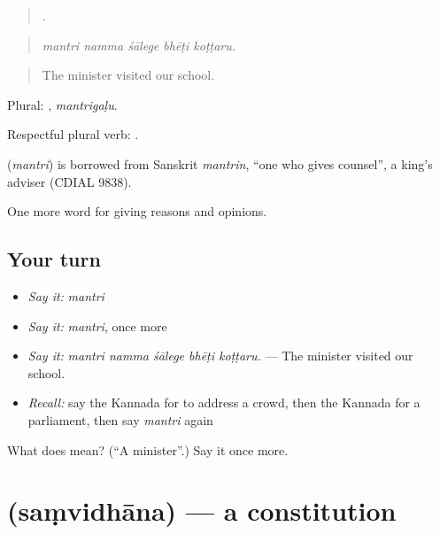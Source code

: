\begin{quote}
    .
\end{quote}

\begin{quote}
\emph{mantri namma śālege bhēṭi koṭṭaru.}
\end{quote}

\begin{quote}
The minister visited our school.
\end{quote}

Plural: , \emph{mantrigaḷu}.

Respectful plural verb:  .

\begin{cousinweb}
\textbf{} (\emph{mantri}) is borrowed from Sanskrit \emph{mantrin}, \textquotedblleft{}one who gives counsel\textquotedblright{}, a king's adviser (CDIAL 9838).
\end{cousinweb}

\begin{grammarlens}[title={What you've built}]
One more word for giving reasons and opinions.
\end{grammarlens}

\subsection*{Your turn}
\begin{itemize}
\raggedright
  \item \emph{Say it:} \emph{mantri}
  \item \emph{Say it:} \emph{mantri}, once more
  \item \emph{Say it:} \emph{mantri namma śālege bhēṭi koṭṭaru.} — The minister visited our school.
  \item \emph{Recall:} say the Kannada for to address a crowd, then the Kannada for a parliament, then say \emph{mantri} again
\end{itemize}

\begin{tcolorbox}[breakable,colback=teal!4,colframe=teal!35!black,title={Before you move on}]
What does  mean? (\textquotedblleft{}A minister\textquotedblright{}.) Say it once more.
\end{tcolorbox}
\section[\texorpdfstring{\kn{ಸಂವಿಧಾನ} (saṃvidhāna)}{ಸಂವಿಧಾನ (saṃvidhāna)}]{ (saṃvidhāna) — a constitution}

